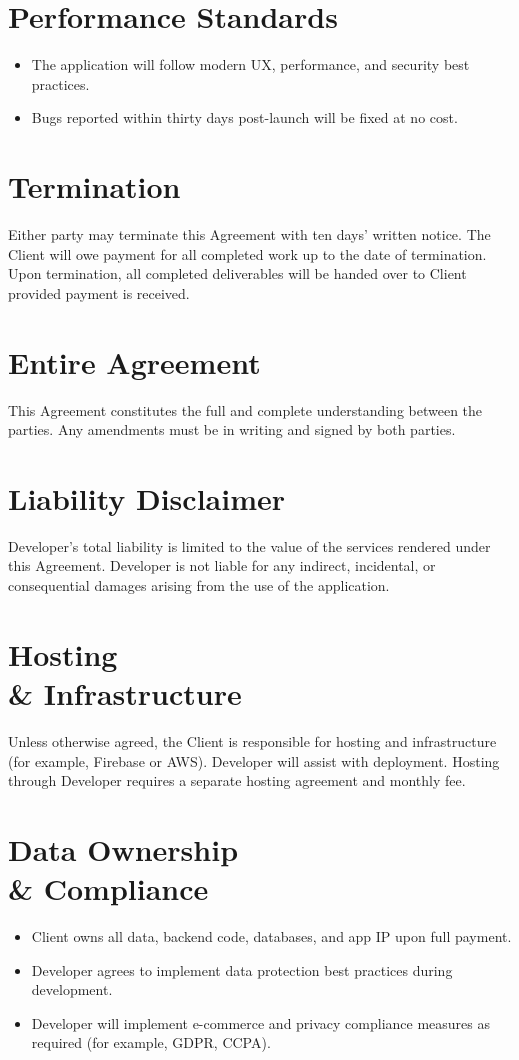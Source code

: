 \documentclass[11pt,letterpaper]{article}
\begin{document}
\section{Performance Standards}
\begin{itemize}[leftmargin=*]
\item The application will follow modern UX, performance, and security best practices.
\item Bugs reported within thirty days post-launch will be fixed at no cost.
\end{itemize}

\section{Termination}
Either party may terminate this Agreement with ten days' written notice. The Client will owe payment for all completed work up to the date of termination. Upon termination, all completed deliverables will be handed over to Client provided payment is received.

\section{Entire Agreement}
This Agreement constitutes the full and complete understanding between the parties. Any amendments must be in writing and signed by both parties.

\section{Liability Disclaimer}
Developer's total liability is limited to the value of the services rendered under this Agreement. Developer is not liable for any indirect, incidental, or consequential damages arising from the use of the application.

\section{Hosting \\& Infrastructure}
Unless otherwise agreed, the Client is responsible for hosting and infrastructure (for example, Firebase or AWS). Developer will assist with deployment. Hosting through Developer requires a separate hosting agreement and monthly fee.

\section{Data Ownership \\& Compliance}
\begin{itemize}[leftmargin=*]
\item Client owns all data, backend code, databases, and app IP upon full payment.
\item Developer agrees to implement data protection best practices during development.
\item Developer will implement e-commerce and privacy compliance measures as required (for example, GDPR, CCPA).
\end{itemize}
\end{document}
